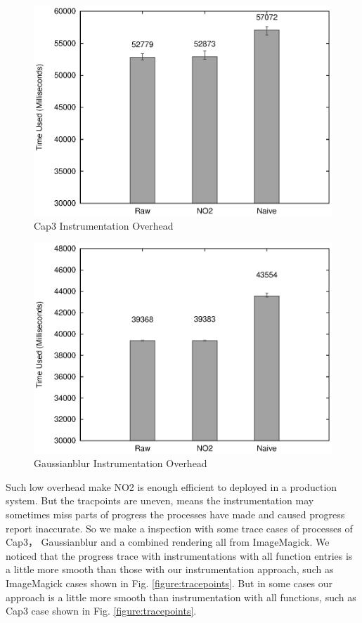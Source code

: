 \begin{figure}
\centering
  \includegraphics[width=0.9\columnwidth]{figures/overhead_cap3.eps}
\caption{Cap3 Instrumentation Overhead}
\label{figure:overhead_cap3}
\end{figure}

\begin{figure}
\centering
  \includegraphics[width=0.9\columnwidth]{figures/overhead_gaussianblur.eps}
\caption{Gaussianblur Instrumentation Overhead}
\label{figure:overhead_gaussianblur}
\end{figure}

Such low overhead make NO2 is enough efficient to deployed in a production system. But the tracpoints are uneven, means the instrumentation may sometimes miss parts of progress the processes have made and caused progress report inaccurate. So we make a inspection with some trace cases of processes of Cap3， Gaussianblur and a combined rendering all from ImageMagick. We noticed that the progress trace with instrumentations with all function entries is a little more smooth than those with our instrumentation approach, such as ImageMagick cases shown in Fig. \ref{figure:tracepoints}. But in some cases our approach is a little more smooth than instrumentation with all functions, such as Cap3 case shown in Fig. \ref{figure:tracepoints}.

